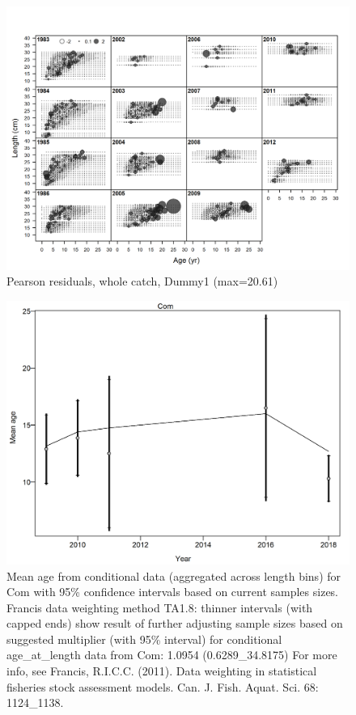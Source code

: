 \documentclass[12pt,]{article}
\begin{document}
\FloatBarrier

\begin{figure}
\centering
\includegraphics{./r4ss/plots_mod1/comp_condAALfit_residsflt12mkt0.png}
\caption{Pearson residuals, whole catch, Dummy1 (max=20.61)
\label{fig:mod1_4_comp_condAALfit_residsflt12mkt0}}
\end{figure}

\begin{figure}
\centering
\includegraphics{./r4ss/plots_mod1/comp_condAALfit_data_weighting_TA1.8_condAgeCom.png}
\caption{Mean age from conditional data (aggregated across length bins)
for Com with 95\% confidence intervals based on current samples sizes.
Francis data weighting method TA1.8: thinner intervals (with capped
ends) show result of further adjusting sample sizes based on suggested
multiplier (with 95\% interval) for conditional age\_at\_length data
from Com: 1.0954 (0.6289\_34.8175) For more info, see Francis, R.I.C.C.
(2011). Data weighting in statistical fisheries stock assessment models.
Can. J. Fish. Aquat. Sci. 68: 1124\_1138.
\label{fig:mod1_5_comp_condAALfit_data_weighting_TA1.8_condAgeCom}}
\end{figure}
\end{document}
